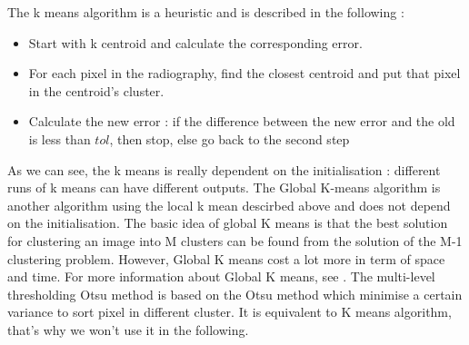 The k means algorithm is a heuristic and is described in the following :
\begin{itemize}
\item Start with k centroid and calculate the corresponding error.
\item For each pixel in the radiography, find the closest centroid and put that pixel in the centroid's cluster.
\item Calculate the new error : if the difference between the new error and the old is less than $tol$, then stop, else go back to the second step
\end{itemize}
As we can see, the k means is really dependent on the initialisation : different runs of k means can have different outputs. The Global K-means algorithm is another algorithm using the local k mean descirbed above and does not depend on the initialisation. The basic idea of global K means is that the best solution for clustering an image into M clusters can be found from the solution of the M-1 clustering problem. However, Global K means cost a lot more in term of space and time. For more information about Global K means, see \cite{gkmeans}. The multi-level thresholding Otsu method is based on the Otsu method which minimise a certain variance to sort pixel in different cluster. It is equivalent to K means algorithm, that's why we won't use it in the following. \\
